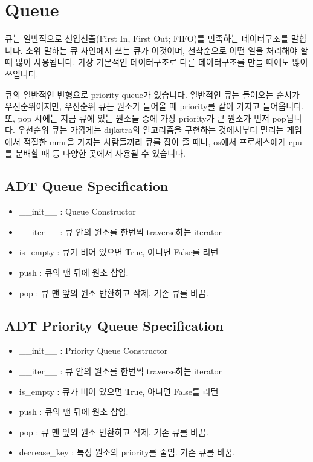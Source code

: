 \documentclass[titlepage]{report}
\begin{document}
\section{Queue} 


큐는 일반적으로 선입선출(First In, First Out; FIFO)를 만족하는 데이터구조를 말합니다. 소위 말하는 큐 사인에서 쓰는 큐가 이것이며, 선착순으로 어떤 일을 처리해야 할 때 많이 사용됩니다. 가장 기본적인 데이터구조로 다른 데이터구조를 만들 때에도 많이 쓰입니다. 

큐의 일반적인 변형으로 priority queue가 있습니다. 일반적인 큐는 들어오는 순서가 우선순위이지만, 우선순위 큐는 원소가 들어올 때 priority를 같이 가지고 들어옵니다. 또, pop 시에는 지금 큐에 있는 원소들 중에 가장 priority가 큰 원소가 먼저 pop됩니다. 우선순위 큐는 가깝게는 dijkstra의 알고리즘을 구현하는 것에서부터 멀리는 게임에서 적절한 mmr을 가지는 사람들끼리 큐를 잡아 줄 때나, os에서 프로세스에게 cpu를 분배할 때 등 다양한 곳에서 사용될 수 있습니다. 

\subsection{ADT Queue Specification}

\begin{itemize} 
\item \_\_init\_\_ : Queue Constructor
\item \_\_iter\_\_ : 큐 안의 원소를 한번씩 traverse하는 iterator
\item is\_empty : 큐가 비어 있으면 True, 아니면 False를 리턴
\item push : 큐의 맨 뒤에 원소 삽입. 
\item pop : 큐 맨 앞의 원소 반환하고 삭제. 기존 큐를 바꿈. 
\end{itemize}

\subsection{ADT Priority Queue Specification}


\begin{itemize} 
\item \_\_init\_\_ : Priority Queue Constructor
\item \_\_iter\_\_ : 큐 안의 원소를 한번씩 traverse하는 iterator
\item is\_empty : 큐가 비어 있으면 True, 아니면 False를 리턴
\item push : 큐의 맨 뒤에 원소 삽입. 
\item pop : 큐 맨 앞의 원소 반환하고 삭제. 기존 큐를 바꿈. 
\item decrease\_key : 특정 원소의 priority를 줄임. 기존 큐를 바꿈. 
\end{itemize}
\end{document}
